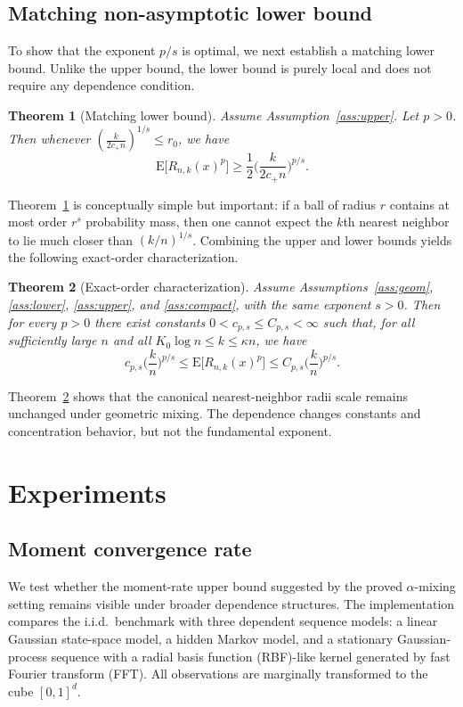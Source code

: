 \documentclass[12pt]{article}
\def\E{{\mathrm E}}
\newtheorem{theorem}{Theorem}
\theoremstyle{definition}
\begin{document}
\subsection{Matching non-asymptotic lower bound}

To show that the exponent $p/s$ is optimal, we next establish a matching lower bound. Unlike the upper bound, the lower bound is purely local and does not require any dependence condition.

\begin{theorem}[Matching lower bound]\label{thm:lower}
Assume Assumption~\ref{ass:upper}. Let $p>0$. Then whenever $(\frac{k}{2c_+ n})^{1/s} \le r_0$, we have
\[
  \E\big[R_{n,k}(x)^p\big]
  \ge
  \frac12\Big(\frac{k}{2c_+ n}\Big)^{p/s}.
\]
\end{theorem}

Theorem~\ref{thm:lower} is conceptually simple but important: if a ball of radius $r$ contains at most order $r^s$ probability mass, then one cannot expect the $k$th nearest neighbor to lie much closer than $(k/n)^{1/s}$. Combining the upper and lower bounds yields the following exact-order characterization.
\begin{theorem}[Exact-order characterization]\label{thm:exact}
Assume Assumptions~\ref{ass:geom}, \ref{ass:lower}, \ref{ass:upper}, and \ref{ass:compact}, with the same exponent $s>0$. Then for every $p>0$ there exist constants $0 < c_{p,s} \le C_{p,s} < \infty$ such that, for all sufficiently large $n$ and all $K_0\log n \le k \le \kappa n$, we have
\[
  c_{p,s}\Big(\frac{k}{n}\Big)^{p/s}
  \le
  \E\big[R_{n,k}(x)^p\big]
  \le
  C_{p,s}\Big(\frac{k}{n}\Big)^{p/s}.
\]
\end{theorem}

Theorem~\ref{thm:exact} shows that the canonical nearest-neighbor radii scale remains unchanged under geometric mixing. The dependence changes constants and concentration behavior, but not the fundamental exponent.


\section{Experiments}

\subsection{Moment convergence rate} \label{exp1:Moment convergence rate}

We test whether the moment-rate upper bound suggested by the proved $\alpha$-mixing setting remains visible under broader dependence structures. The implementation compares the i.i.d.\ benchmark with three dependent sequence models: a linear Gaussian state-space model, a hidden Markov model, and a stationary Gaussian-process sequence with a radial basis function (RBF)-like kernel generated by fast Fourier transform (FFT). All observations are marginally transformed to the cube $[0,1]^d$.
\end{document}
